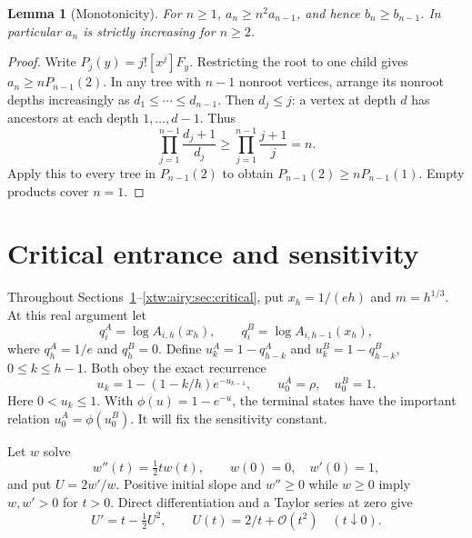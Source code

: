 \documentclass[11pt]{article}
\newtheorem{lemma}[theorem]{Lemma}
\theoremstyle{remark}\newtheorem{remark}[theorem]{Remark}
\newcommand{\OO}{\mathcal O}
\begin{document}
\begin{lemma}[Monotonicity]\label{xtw:airy:lem:monotonicity}
For $n\ge1$, $a_n\ge n^2a_{n-1}$, and hence $b_n\ge b_{n-1}$.
In particular $a_n$ is strictly increasing for $n\ge2$.
\end{lemma}
\begin{proof}
Write $P_j(y)=j![x^j]F_y$. Restricting the root to one child gives
$a_n\ge nP_{n-1}(2)$. In any tree with $n-1$ nonroot vertices, arrange its
nonroot depths increasingly as $d_1\le\cdots\le d_{n-1}$. Then $d_j\le j$:
a vertex at depth $d$ has ancestors at each depth $1,\ldots,d-1$. Thus
\[
 \prod_{j=1}^{n-1}\frac{d_j+1}{d_j}
 \ge\prod_{j=1}^{n-1}\frac{j+1}{j}=n.
\]
Apply this to every tree in $P_{n-1}(2)$ to obtain
$P_{n-1}(2)\ge nP_{n-1}(1)$. Empty products cover $n=1$.
\end{proof}

\section{Critical entrance and sensitivity}\label{xtw:airy:sec:entrance}
Throughout Sections~\ref{xtw:airy:sec:entrance}--\ref{xtw:airy:sec:critical}, put
$x_h=1/(eh)$ and $m=h^{1/3}$. At this real argument let
\[
 q_i^A=\log A_{i,h}(x_h),\qquad q_i^B=\log A_{i,h-1}(x_h),
\]
where $q_h^A=1/e$ and $q_h^B=0$. Define
$u_k^A=1-q_{h-k}^A$ and $u_k^B=1-q_{h-k}^B$, $0\le k\le h-1$.
Both obey the exact recurrence
\begin{equation}\label{xtw:airy:eq:urec}
 u_k=1-(1-k/h)e^{-u_{k-1}},\qquad
 u_0^A=\rho,\quad u_0^B=1.
\end{equation}
Here $0<u_k\le1$. With $\phi(u)=1-e^{-u}$, the terminal states have the
important relation $u_0^A=\phi(u_0^B)$. It will fix the sensitivity constant.

Let $w$ solve
\begin{equation}\label{xtw:airy:eq:wode}
 w''(t)=\tfrac12tw(t),\qquad w(0)=0,\quad w'(0)=1,
\end{equation}
and put $U=2w'/w$. Positive initial slope and $w''\ge0$ while $w\ge0$ imply
$w,w'>0$ for $t>0$. Direct differentiation and a Taylor series at zero give
\begin{equation}\label{xtw:airy:eq:riccati}
 U'=t-\tfrac12U^2,\qquad U(t)=2/t+\OO(t^2)\quad(t\downarrow0).
\end{equation}
\end{document}
